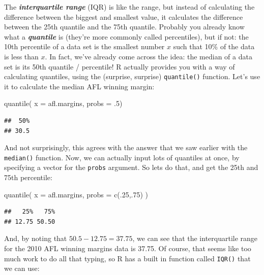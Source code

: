 \documentclass[
]{book}
\newenvironment{Shaded}{\begin{snugshade}}{\end{snugshade}}
\newcommand{\AttributeTok}[1]{\textcolor[rgb]{0.77,0.63,0.00}{#1}}
\newcommand{\DecValTok}[1]{\textcolor[rgb]{0.00,0.00,0.81}{#1}}
\newcommand{\FunctionTok}[1]{\textcolor[rgb]{0.00,0.00,0.00}{#1}}
\newcommand{\NormalTok}[1]{#1}
\begin{document}
The \textbf{\emph{interquartile range}} (IQR) is like the range, but instead of calculating the difference between the biggest and smallest value, it calculates the difference between the 25th quantile and the 75th quantile. Probably you already know what a \textbf{\emph{quantile}} is (they're more commonly called percentiles), but if not: the 10th percentile of a data set is the smallest number \(x\) such that 10\% of the data is less than \(x\). In fact, we've already come across the idea: the median of a data set is its 50th quantile / percentile! R actually provides you with a way of calculating quantiles, using the (surprise, surprise) \texttt{quantile()} function. Let's use it to calculate the median AFL winning margin:

\begin{Shaded}
\begin{Highlighting}[]
\FunctionTok{quantile}\NormalTok{( }\AttributeTok{x =}\NormalTok{ afl.margins, }\AttributeTok{probs =}\NormalTok{ .}\DecValTok{5}\NormalTok{)}
\end{Highlighting}
\end{Shaded}

\begin{verbatim}
##  50% 
## 30.5
\end{verbatim}

And not surprisingly, this agrees with the answer that we saw earlier with the \texttt{median()} function. Now, we can actually input lots of quantiles at once, by specifying a vector for the \texttt{probs} argument. So lets do that, and get the 25th and 75th percentile:

\begin{Shaded}
\begin{Highlighting}[]
\FunctionTok{quantile}\NormalTok{( }\AttributeTok{x =}\NormalTok{ afl.margins, }\AttributeTok{probs =} \FunctionTok{c}\NormalTok{(.}\DecValTok{25}\NormalTok{,.}\DecValTok{75}\NormalTok{) )}
\end{Highlighting}
\end{Shaded}

\begin{verbatim}
##   25%   75% 
## 12.75 50.50
\end{verbatim}

And, by noting that \(50.5 - 12.75 = 37.75\), we can see that the interquartile range for the 2010 AFL winning margins data is 37.75. Of course, that seems like too much work to do all that typing, so R has a built in function called \texttt{IQR()} that we can use:
\end{document}
